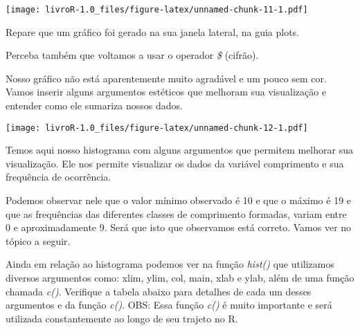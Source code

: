 \documentclass[]{book}
\newenvironment{Shaded}{\begin{snugshade}}{\end{snugshade}}
\newcommand{\DataTypeTok}[1]{\textcolor[rgb]{0.13,0.29,0.53}{#1}}
\newcommand{\DecValTok}[1]{\textcolor[rgb]{0.00,0.00,0.81}{#1}}
\newcommand{\KeywordTok}[1]{\textcolor[rgb]{0.13,0.29,0.53}{\textbf{#1}}}
\newcommand{\NormalTok}[1]{#1}
\newcommand{\OperatorTok}[1]{\textcolor[rgb]{0.81,0.36,0.00}{\textbf{#1}}}
\newcommand{\StringTok}[1]{\textcolor[rgb]{0.31,0.60,0.02}{#1}}
\begin{document}
\begin{Shaded}
\end{Shaded}

\texttt{[image: livroR-1.0\_files/figure-latex/unnamed-chunk-11-1.pdf]}

Repare que um gráfico foi gerado na sua janela lateral, na guia plots.

Perceba também que voltamos a usar o operador \emph{\$} (cifrão).

Nosso gráfico não está aparentemente muito agradável e um pouco sem cor. Vamos inserir alguns argumentos estéticos que melhoram sua visualização e entender como ele sumariza nossos dados.

\begin{Shaded}
\end{Shaded}

\texttt{[image: livroR-1.0\_files/figure-latex/unnamed-chunk-12-1.pdf]}

Temos aqui nosso histograma com alguns argumentos que permitem melhorar sua visualização. Ele nos permite visualizar os dados da variável comprimento e sua frequência de ocorrência.

Podemos observar nele que o valor mínimo observado é 10 e que o máximo é 19 e que as frequências das diferentes classes de comprimento formadas, variam entre 0 e aproximadamente 9. Será que isto que observamos está correto. Vamos ver no tópico a seguir.

Ainda em relação ao histograma podemos ver na função \emph{hist()} que utilizamos diversos argumentos como: xlim, ylim, col, main, xlab e ylab, além de uma função chamada \emph{c()}. Verifique a tabela abaixo para detalhes de cada um desses argumentos e da função \emph{c()}. OBS: Essa função \emph{c()} é muito importante e será utilizada constantemente ao longo de seu trajeto no R.
\end{document}
